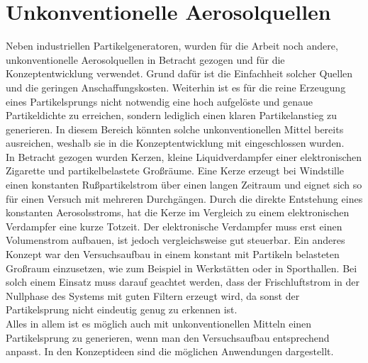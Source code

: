 \section{Unkonventionelle Aerosolquellen}
Neben industriellen Partikelgeneratoren, wurden f\"{u}r die Arbeit noch andere, unkonventionelle Aerosolquellen in Betracht gezogen und f\"{u}r die Konzeptentwicklung verwendet. Grund daf\"{u}r ist die Einfachheit solcher Quellen und die geringen Anschaffungskosten. Weiterhin ist es f\"{u}r die reine Erzeugung eines Partikelsprungs nicht notwendig eine hoch aufgel\"{o}ste und genaue Partikeldichte zu erreichen, sondern lediglich einen klaren Partikelanstieg zu generieren. In diesem Bereich k\"{o}nnten solche unkonventionellen Mittel bereits ausreichen, weshalb sie in die Konzeptentwicklung mit eingeschlossen wurden.\\
In Betracht gezogen wurden Kerzen, kleine Liquidverdampfer einer elektronischen Zigarette und partikelbelastete Gro{\ss}r\"{a}ume. Eine Kerze erzeugt bei Windstille einen konstanten Ru{\ss}partikelstrom \"{u}ber einen langen Zeitraum und eignet sich so f\"{u}r einen Versuch mit mehreren Durchg\"{a}ngen. Durch die direkte Entstehung eines konstanten Aerosolsstroms, hat die Kerze im Vergleich zu einem elektronischen Verdampfer eine kurze Totzeit. Der elektronische Verdampfer muss erst einen Volumenstrom aufbauen, ist jedoch vergleichsweise gut steuerbar. Ein anderes Konzept war den Versuchsaufbau in einem konstant mit Partikeln belasteten Gro{\ss}raum einzusetzen, wie zum Beispiel in Werkst\"{a}tten oder in Sporthallen. Bei solch einem Einsatz muss darauf geachtet werden, dass der Frischluftstrom in der Nullphase des Systems mit guten Filtern erzeugt wird, da sonst der Partikelsprung nicht eindeutig genug zu erkennen ist.\\
Alles in allem ist es m\"{o}glich auch mit unkonventionellen Mitteln einen Partikelsprung zu generieren, wenn man den Versuchsaufbau entsprechend anpasst. In den Konzeptideen sind die m\"{o}glichen Anwendungen dargestellt.